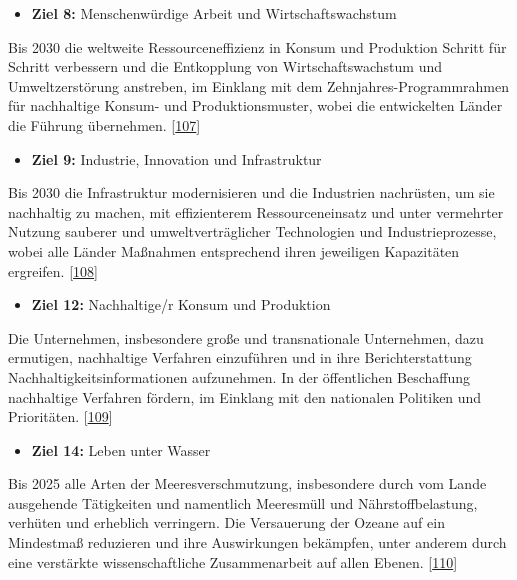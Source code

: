\documentclass[
    headings=optiontotocandhead,%
    twoside,
    numbers=noenddot,%
    12pt, %
    titlepage, %
    parskip=full, %
    listof=leveldown, 
    numbers=noenddot, %
    a4paper,DIV=14,
    BCOR=15mm,
]{scrbook}
\renewenvironment{quote}{\begin{customblockquote}\list{}{\rightmargin=0em\leftmargin=0em}%
\item\relax\color{blockquote-text}\ignorespaces}{\unskip\unskip\endlist\end{customblockquote}}
\providecommand{\tightlist}{%
  \setlength{\itemsep}{0pt}\setlength{\parskip}{0pt}}
\begin{document}
\begin{itemize}
\tightlist
\item
  \textbf{Ziel 8:} Menschenwürdige Arbeit und Wirtschafts­wachstum
\end{itemize}

\begin{quote}
Bis 2030 die weltweite Ressourceneffizienz in Konsum und Produktion
Schritt für Schritt verbessern und die Entkopplung von
Wirtschaftswachstum und Umweltzerstörung anstreben, im Einklang mit dem
Zehnjahres-Programmrahmen für nachhaltige Konsum- und Produktionsmuster,
wobei die entwickelten Länder die Führung übernehmen.
{[}\protect\hyperlink{ref-sdg8}{107}{]}
\end{quote}

\begin{itemize}
\tightlist
\item
  \textbf{Ziel 9:} Industrie, Innovation und Infrastruktur
\end{itemize}

\begin{quote}
Bis 2030 die Infrastruktur modernisieren und die Industrien nachrüsten,
um sie nachhaltig zu machen, mit effizienterem Ressourceneinsatz und
unter vermehrter Nutzung sauberer und umweltverträglicher Technologien
und Industrieprozesse, wobei alle Länder Maßnahmen entsprechend ihren
jeweiligen Kapazitäten ergreifen.
{[}\protect\hyperlink{ref-sdg9}{108}{]}
\end{quote}

\begin{itemize}
\tightlist
\item
  \textbf{Ziel 12:} Nachhaltige/r Konsum und Produktion
\end{itemize}

\begin{quote}
Die Unternehmen, insbesondere große und transnationale Unternehmen, dazu
ermutigen, nachhaltige Verfahren einzuführen und in ihre
Berichterstattung Nachhaltigkeitsinformationen aufzunehmen. In der
öffentlichen Beschaffung nachhaltige Verfahren fördern, im Einklang mit
den nationalen Politiken und Prioritäten.
{[}\protect\hyperlink{ref-sdg12}{109}{]}
\end{quote}

\begin{itemize}
\tightlist
\item
  \textbf{Ziel 14:} Leben unter Wasser
\end{itemize}

\begin{quote}
Bis 2025 alle Arten der Meeresverschmutzung, insbesondere durch vom
Lande ausgehende Tätigkeiten und namentlich Meeresmüll und
Nährstoffbelastung, verhüten und erheblich verringern. Die Versauerung
der Ozeane auf ein Mindestmaß reduzieren und ihre Auswirkungen
bekämpfen, unter anderem durch eine verstärkte wissenschaftliche
Zusammenarbeit auf allen Ebenen.
{[}\protect\hyperlink{ref-sdg14}{110}{]}
\end{quote}
\end{document}
